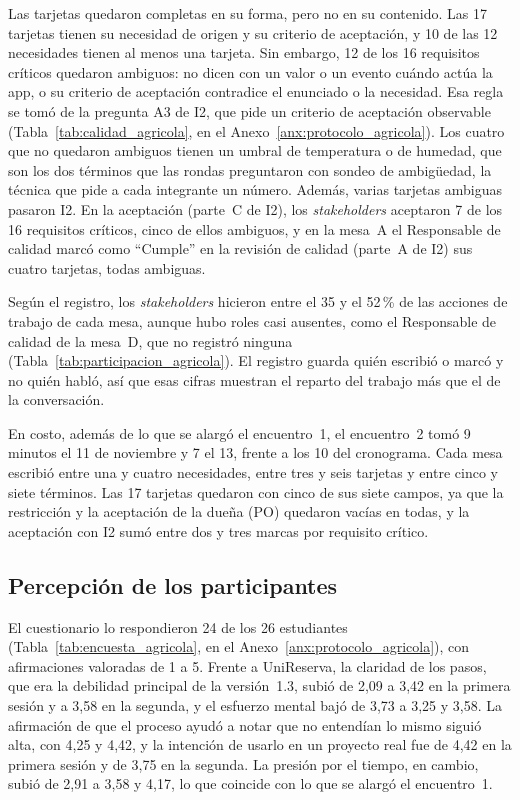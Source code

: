 \documentclass[12pt,letterpaper,oneside]{report}
\begin{document}
Las tarjetas quedaron completas en su forma, pero no en su contenido. Las 17
tarjetas tienen su necesidad de origen y su criterio de aceptación, y 10 de las
12 necesidades tienen al menos una tarjeta. Sin embargo, 12 de los 16
requisitos críticos quedaron ambiguos: no dicen con un valor o un evento cuándo
actúa la app, o su criterio de aceptación contradice el enunciado o la
necesidad. Esa regla se tomó de la pregunta A3 de I2, que pide un criterio de
aceptación observable (Tabla~\ref{tab:calidad_agricola}, en el
Anexo~\ref{anx:protocolo_agricola}). Los cuatro que no quedaron ambiguos tienen
un umbral de temperatura o de humedad, que son los dos términos que las rondas
preguntaron con sondeo de ambigüedad, la técnica que pide a cada integrante un
número. Además, varias tarjetas ambiguas pasaron I2. En la aceptación (parte~C
de I2), los \textit{stakeholders} aceptaron 7 de los 16 requisitos críticos,
cinco de ellos ambiguos, y en la mesa~A el Responsable de calidad marcó como
``Cumple'' en la revisión de calidad (parte~A de I2) sus cuatro tarjetas, todas
ambiguas.

Según el registro, los \textit{stakeholders} hicieron entre el 35 y el 52\,\% de
las acciones de trabajo de cada mesa, aunque hubo roles casi ausentes, como el
Responsable de calidad de la mesa~D, que no registró ninguna
(Tabla~\ref{tab:participacion_agricola}). El registro guarda quién escribió o
marcó y no quién habló, así que esas cifras muestran el reparto del trabajo más
que el de la conversación.

En costo, además de lo que se alargó el encuentro~1, el encuentro~2 tomó 9
minutos el 11 de noviembre y 7 el 13, frente a los 10 del cronograma. Cada mesa
escribió entre una y cuatro necesidades, entre tres y seis tarjetas y entre
cinco y siete términos. Las 17 tarjetas quedaron con cinco de sus siete campos,
ya que la restricción y la aceptación de la dueña (PO) quedaron vacías en todas,
y la aceptación con I2 sumó entre dos y tres marcas por requisito crítico.

\subsection{Percepción de los participantes}
El cuestionario lo respondieron 24 de los 26 estudiantes
(Tabla~\ref{tab:encuesta_agricola}, en el Anexo~\ref{anx:protocolo_agricola}),
con afirmaciones valoradas de 1 a 5. Frente a UniReserva, la claridad de los
pasos, que era la debilidad principal de la versión~1.3, subió de 2,09 a 3,42 en
la primera sesión y a 3,58 en la segunda, y el esfuerzo mental bajó de 3,73 a
3,25 y 3,58. La afirmación de que el proceso ayudó a notar que no entendían lo
mismo siguió alta, con 4,25 y 4,42, y la intención de usarlo en un proyecto real
fue de 4,42 en la primera sesión y de 3,75 en la segunda. La presión por el
tiempo, en cambio, subió de 2,91 a 3,58 y 4,17, lo que coincide con lo que se
alargó el encuentro~1.
\end{document}
